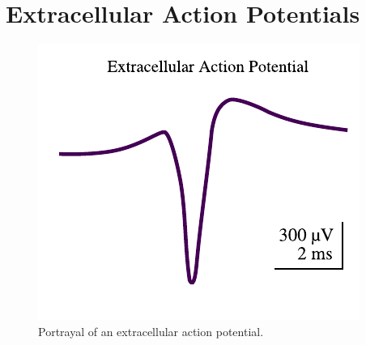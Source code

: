 \documentclass[altfont, fleqn]{uiophd}
\begin{document}






\newpage
\section{Extracellular Action Potentials}
\begin{figure}
    \vspace{-20pt}
    \begin{center}
        \includegraphics[width=\linewidth]{images/sec_2/eap.pdf}
        \vspace{-20pt}
        \caption{%
            Portrayal of an extracellular action potential. 
        }
        \label{fig:2_eap}
        \vspace{-10pt}
    \end{center}
\end{figure}
\end{document}
